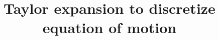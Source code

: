 \documentclass{memoir}
\begin{document}
\title{Taylor expansion to discretize equation of motion}
\maketitle
\end{document}
